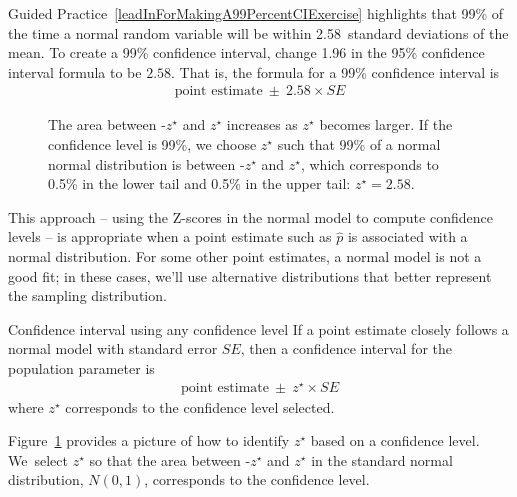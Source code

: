 Guided Practice~\ref{leadInForMakingA99PercentCIExercise} highlights
that 99\% of the time a normal random variable will be within
2.58~standard deviations of the mean.
To create a 99\% confidence interval, change 1.96 in the 95\%
confidence interval formula to be $2.58$.
That is, the formula
for a 99\% confidence interval is
\begin{align*}
\text{point estimate}\ \pm\ 2.58 \times SE
\end{align*}

\begin{figure}[h]
  \centering
  \caption{The area between -$z^{\star}$ and $z^{\star}$ increases as
      $z^{\star}$ becomes larger. If the confidence level is 99\%,
      we choose $z^{\star}$ such that 99\% of a normal
      normal distribution is between -$z^{\star}$ and $z^{\star}$,
      which corresponds to 0.5\%
      in the lower tail and 0.5\% in the upper tail:
      $z^{\star}=2.58$.}
\label{choosingZForCI}
\end{figure}

\D{\newpage}

This approach -- using the Z-scores in the
normal model to compute confidence levels --
is appropriate when a point estimate such as $\hat{p}$
is associated with a normal distribution.
For some other point estimates, a normal model is not a good fit;
in these cases, we'll use alternative distributions that better
represent the sampling distribution.

\begin{onebox}{Confidence interval using any confidence level}
  If a point estimate closely follows a normal model
  with standard error $SE$, then a confidence interval
  for the population parameter is
  \begin{align*}
  \text{point estimate}\ \pm\ z^{\star} \times SE
  \end{align*}
  where $z^{\star}$ corresponds to the confidence
  level selected.
\end{onebox}

Figure~\ref{choosingZForCI} provides a picture of how to identify
$z^{\star}$ based on a confidence level. We~select $z^{\star}$
so that the area between -$z^{\star}$ and $z^{\star}$ in the
standard normal distribution,
$N(0, 1)$, corresponds to the confidence level.

